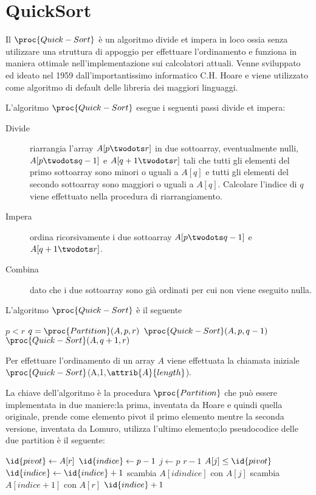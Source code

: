 \chapter{QuickSort}
Il $\proc{Quick-Sort}$ è un algoritmo divide et impera in loco ossia senza utilizzare
una struttura di appoggio per effettuare l'ordinamento e funziona in maniera ottimale
nell'implementazione sui calcolatori attuali.\newline
Venne sviluppato ed ideato nel 1959 dall'importantissimo informatico C.H. Hoare
e viene utilizzato come algoritmo di default delle libreria dei maggiori linguaggi.

L'algoritmo $\proc{Quick-Sort}$ esegue i seguenti passi divide et impera:
\begin{description}
  \item[Divide] riarrangia l'array $A[p\twodots r]$ in due sottoarray, eventualmente nulli,
                $A[p \twodots q-1]$ e $A[q+1 \twodots r]$ tali che tutti gli elementi
                del primo sottoarray sono minori o uguali a $A[q]$ e tutti gli elementi
                del secondo sottoarray sono maggiori o uguali a $A[q]$.\newline
                Calcolare l'indice di $q$ viene effettuato nella procedura di riarrangiamento.
  \item[Impera] ordina ricorsivamente i due sottoarray $A[p \twodots q-1]$ e $A[q+1 \twodots r]$.
  \item[Combina] dato che i due sottoarray sono già ordinati per cui non viene eseguito nulla.
\end{description}

L'algoritmo $\proc{Quick-Sort}$ è il seguente
\begin{codebox}
\li \If $p < r$
    \Then
\li           $q = \proc{Partition}(A,p,r)$
\li           $\proc{Quick-Sort}(A,p,q-1)$
\li           $\proc{Quick-Sort}(A,q+1,r)$
    \End
\end{codebox}
Per effettuare l'ordinamento di un array $A$ viene effettuata la chiamata iniziale
$\proc{Quick-Sort}$(A,1,$\attrib{A}{length}$).

La chiave dell'algoritmo è la procedura $\proc{Partition}$ che può essere implementata
in due maniere:la prima, inventata da Hoare e quindi quella originale, prende come elemento
pivot il primo elemento mentre la seconda versione, inventata da Lomuro, utilizza
l'ultimo elemento;lo pseudocodice delle due partition è il seguente:
\begin{codebox}
\li $\id{pivot} \gets A[r]$
\li $\id{indice} \gets p-1$
\li \For $j \gets p$ \To $r-1$
    \Do
\li               \If $A[j] \leq \id{pivot}$
                  \Then
\li                              $\id{indice} \gets \id{indice} + 1$
\li                              scambia $A[id{indice}]$ con $A[j]$
                  \End
    \End
\li scambia $A[indice+1]$ con $A[r]$
\li \Return $\id{indice} + 1$
\end{codebox}

